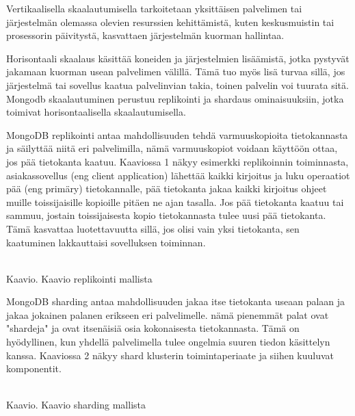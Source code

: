 Vertikaalisella skaalautumisella tarkoitetaan yksittäisen palvelimen tai järjestelmän olemassa olevien resurssien kehittämistä, 
kuten keskusmuistin tai prosessorin päivitystä, kasvattaen järjestelmän kuorman hallintaa.
\medskip

Horisontaali skaalaus käsittää koneiden ja järjestelmien lisäämistä, jotka pystyvät jakamaan kuorman usean palvelimen välillä.
Tämä tuo myös lisä turvaa sillä, jos järjestelmä tai sovellus kaatua palvelinvian takia, 
toinen palvelin voi tuurata sitä. 
Mongodb skaalautuminen perustuu replikointi ja shardaus ominaisuuksiin, jotka toimivat horisontaalisella skaalautumisella. 
\medskip






MongoDB replikointi antaa mahdollisuuden tehdä varmuuskopioita tietokannasta ja säilyttää niitä eri palvelimilla, 
nämä varmuuskopiot voidaan käyttöön ottaa, jos pää tietokanta kaatuu. 
Kaaviossa 1 näkyy esimerkki replikoinnin toiminnasta, asiakassovellus (eng client application) lähettää kaikki kirjoitus ja luku operaatiot pää (eng primäry) tietokannalle, 
pää tietokanta jakaa kaikki kirjoitus ohjeet muille toissijaisille kopioille pitäen ne ajan tasalla.
Jos pää tietokanta kaatuu tai sammuu, jostain toissijaisesta kopio tietokannasta tulee uusi pää tietokanta.
Tämä kasvattaa luotettavuutta sillä, jos olisi vain yksi tietokanta, sen kaatuminen lakkauttaisi sovelluksen toiminnan. 
\medskip
\bigskip

\\
Kaavio\getChartCount{}. Kaavio replikointi mallista 
\medskip



MongoDB sharding antaa mahdollisuuden jakaa itse tietokanta useaan palaan ja jakaa jokainen palanen erikseen eri palvelimelle.
nämä pienemmät palat ovat "shardeja"{} ja ovat itsenäisiä osia kokonaisesta tietokannasta.
Tämä on hyödyllinen, kun yhdellä palvelimella tulee ongelmia suuren tiedon käsittelyn kanssa.
Kaaviossa 2 näkyy shard klusterin toimintaperiaate ja siihen kuuluvat komponentit. 
\medskip



\bigskip
\\
Kaavio\getChartCount{}. Kaavio sharding mallista 
\medskip


